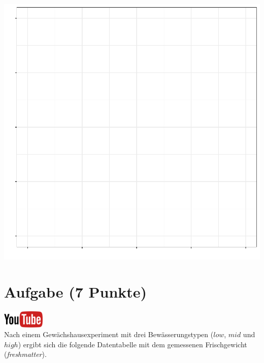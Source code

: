 \documentclass[a4paper, 10pt]{scrartcl}\usepackage[]{graphicx}\usepackage[]{xcolor}
\makeatletter
\def\maxwidth{ %
  \ifdim\Gin@nat@width>\linewidth
    \linewidth
  \else
    \Gin@nat@width
  \fi
}
\makeatother
\begin{document}
{\centering \includegraphics[width=\maxwidth]{img/desc-01-1} 

}


 
\clearpage

\section{Aufgabe \hfill (7 Punkte)}

\hfill\href{https://youtu.be/vXnLttRL_VI}{\includegraphics[width =
  2cm]{img/youtube}}\\[1Ex]

Nach einem Gew{\"a}chshausexperiment mit drei Bew{\"a}sserungstypen ($low$, $mid$
und $high$) ergibt sich die folgende Datentabelle mit dem gemessenen
Frischgewicht (\textit{freshmatter}).
\end{document}
